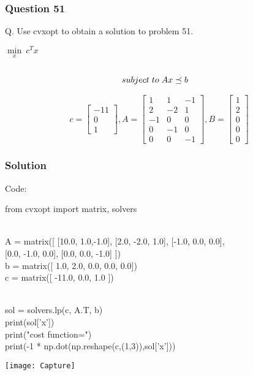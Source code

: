 \documentclass{beamer}
\begin{document}
\begin{frame}
\frametitle{Question 51}
Q. Use cvxopt to obtain a solution to problem 51.  
 \begin{center}

 $\min\limits_{x}\ c^Tx$
\begin{alignat*}{2}
  \\subject\hspace{0.1cm} to\hspace{0.1cm}  Ax &\preceq b
\end{alignat*}

\end{center}
\[
c = 
\begin{bmatrix}
-11 
\\0
\\1
\end{bmatrix}
,A = 
\begin{bmatrix}
1  & 1 & -1
\\2  & -2 & 1
\\-1  & 0 & 0
\\0  & -1 & 0
\\0 & 0 & -1
\end{bmatrix}
,B = 
\begin{bmatrix}
1
\\2 
\\0 
\\0
\\0
\end{bmatrix}
\]
\end{frame}

\begin{frame}
\frametitle{Solution}
\begin{block}{Code:}

from cvxopt import matrix, solvers \vspace{0.5cm}

\\ A = matrix([ [10.0, 1.0,-1.0],
            [2.0, -2.0, 1.0],
            [-1.0, 0.0, 0.0],
 \\ \hspace{2cm}         [0.0, -1.0, 0.0], 
            [0.0, 0.0, -1.0]  ])
\\ b = matrix([ 1.0, 2.0, 0.0, 0.0, 0.0])
\\ c = matrix([ -11.0, 0.0, 1.0 ])

\\ sol = solvers.lp(c, A.T, b)
\\ print(sol['x'])
\\ print("cost function=")
\\ print(-1 * np.dot(np.reshape(c,(1,3)),sol['x']))
 \end{block}
  \texttt{[image: Capture]}
\end{frame}
\end{document}
